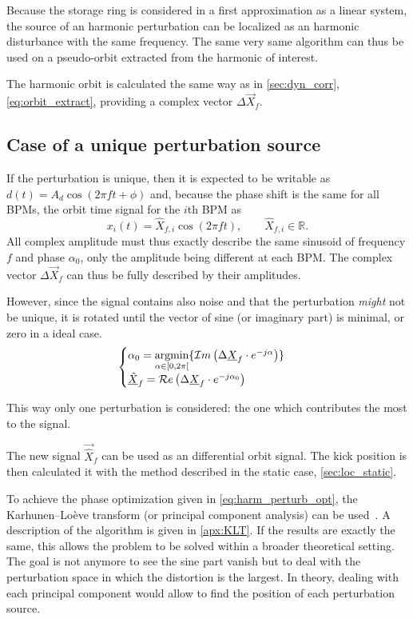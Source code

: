 Because the storage ring is considered in a first approximation as a linear system, the source of an harmonic perturbation can be localized as an harmonic disturbance with the same frequency. The same very same algorithm can thus be used on a pseudo-orbit extracted from the harmonic of interest. 

The harmonic orbit is calculated the same way as in \cref{sec:dyn_corr}, \cref{eq:orbit_extract}, providing a complex vector $\Delta\vec{X}_f$.

\subsection{Case of a unique perturbation source}
If the perturbation is unique, then it is expected to be writable as $d(t) = A_d\cos(2\pi f t + \phi)$ and, because the phase shift is the same for all BPMs, the orbit time signal for the $i$th BPM as 
\begin{equation}
	x_i(t) = \hat{X}_{f,i} \cos (2\pi f t), \qquad \hat{X}_{f,i} \in \mathbb{R}.
\end{equation}
All complex amplitude must thus exactly describe the same sinusoid of frequency $f$ and phase $\alpha_0$, only the amplitude being different at each BPM.
The complex vector $\Delta\vec{X}_f$ can thus be fully described by their amplitudes.

However, since the signal contains also noise and that the perturbation \emph{might} not be unique, it is rotated until the vector of sine (or imaginary part) is minimal, or zero in a ideal case.
\begin{equation}
\begin{cases}\alpha_0 = \underset{\alpha \in [0, 2\pi[}{\textrm{argmin}}\{\mathcal{I}m\left(\Delta\underline{X}_f \cdot e^{-j\alpha}\right) \} \label{eq:harm_perturb_opt}\\
\underline{\hat{X}}_f = \mathcal{R}e\left(\Delta\underline{X}_f \cdot e^{-j\alpha_0}\right)
\end{cases}
\end{equation}

This way only one perturbation is considered: the one which contributes the most to the signal.

The new signal $\vec{\hat{X}}_f$ can be used as an differential orbit signal. The kick position is then calculated it with the method described in the static case, \cref{sec:loc_static}.

\remark To achieve the phase optimization given in \cref{eq:harm_perturb_opt}, the Karhunen–Loève transform (or principal component analysis) can be used~\cite{book:wang_2012}. A description of the algorithm is given in \cref{apx:KLT}. If the results are exactly the same, this allows the problem to be solved within a broader theoretical setting. The goal is not anymore to see the sine part vanish but to deal with the perturbation space in which the distortion is the largest. In theory, dealing with each principal component would allow to find the position of each perturbation source.

